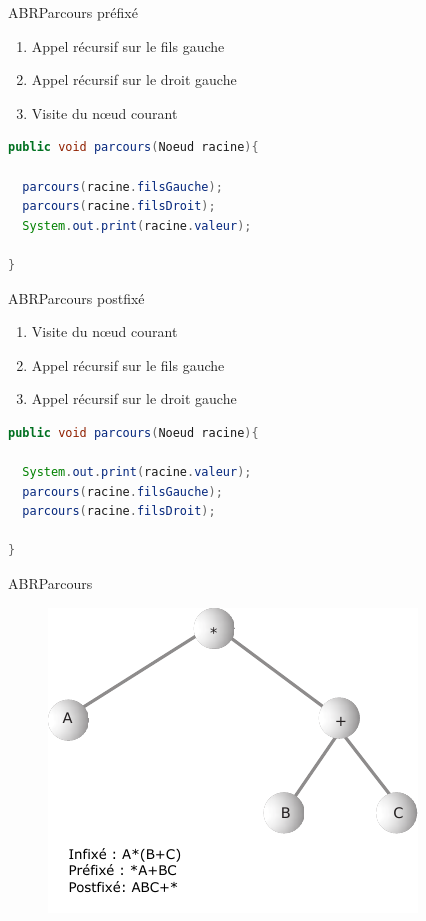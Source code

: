 \documentclass[12pt,a4paper]{beamer}
\begin{document}
\begin{frame}[fragile]{ABR}{Parcours préfixé}
\begin{enumerate}
\item Appel récursif sur le fils gauche
\item Appel récursif sur le droit gauche
\item Visite du n\oe ud courant
\end{enumerate}

\begin{lstlisting}[language=Java]
public void parcours(Noeud racine){

  parcours(racine.filsGauche);
  parcours(racine.filsDroit);
  System.out.print(racine.valeur);

}
\end{lstlisting}

\end{frame}


\begin{frame}[fragile]{ABR}{Parcours postfixé}
\begin{enumerate}
\item Visite du n\oe ud courant
\item Appel récursif sur le fils gauche
\item Appel récursif sur le droit gauche
\end{enumerate}

\begin{lstlisting}[language=Java]
public void parcours(Noeud racine){

  System.out.print(racine.valeur);
  parcours(racine.filsGauche);
  parcours(racine.filsDroit);

}
\end{lstlisting}
\end{frame}

\begin{frame}{ABR}{Parcours}
\begin{figure}
\includegraphics[scale=1]{figs/traversing_tree}
\end{figure}
\end{frame}
\end{document}
